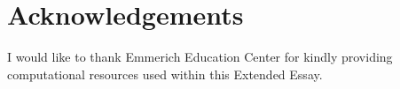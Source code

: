 \section{Acknowledgements}%
\label{sec:acknowledgements}

I would like to thank Emmerich Education Center for kindly providing computational resources used within this Extended Essay.
